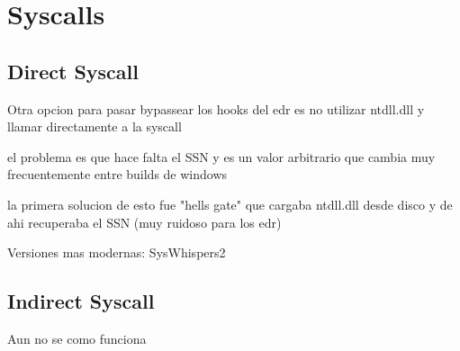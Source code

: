 \section{Syscalls}

\subsection{Direct Syscall}

Otra opcion para pasar bypassear los hooks del edr es no utilizar ntdll.dll y 
llamar directamente a la syscall

el problema es que hace falta el SSN y es un valor arbitrario que cambia muy 
frecuentemente entre builds de windows

la primera solucion de esto fue "hells gate" que cargaba ntdll.dll desde disco
y de ahi recuperaba el SSN (muy ruidoso para los edr)

Versiones mas modernas: SysWhispers2

\subsection{Indirect Syscall}

Aun no se como funciona